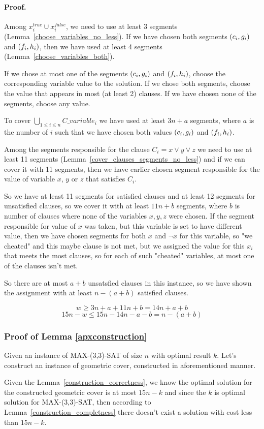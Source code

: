 \paragraph{Proof.}
Among $x_i^{true} \cup x_i^{false}$,
we need to use at least 3 segments (Lemma~\ref{choose_variables_no_less}).
If we have chosen both segments $(c_i, g_i)$ and $(f_i, h_i)$,
then we have used at least 4 segments (Lemma~\ref{choose_variables_both}).

If we chose at most one of the segments $(c_i, g_i)$ and $(f_i, h_i)$,
choose the corresponding variable value to the solution.
If we chose both segments,
choose the value that appears in most (at least 2) clauses.
If we have chosen none of the segments, choose any value.

To cover $\bigcup_{1 \le i \le n} C\_variable_i$
we have used at least $3n + a$ segments,
where $a$ is the number of $i$ such that we have chosen both
values $(c_i, g_i)$ and $(f_i, h_i)$.

Among the segments responsible for the clause $C_i = x \lor y \lor z$
we need to use at least 11 segments
(Lemma~\ref{cover_clauses_segments_no_less})
and if we can cover it with 11 segments, then we have 
earlier chosen
segment responsible for the value of variable $x$, $y$ or $z$
that satisfies $C_i$.

So we have at least 11 segments for satisfied clauses
and at least 12 segments
for unsatisfied clauses, so we cover it with 
at least $11n + b$ segments, where $b$ is number of clauses
where none of the variables $x, y, z$ were chosen.
If the segment responsible for value of $x$ was taken,
but this variable is set to have different value,
then we have chosen segments for both $x$ and $\neg x$ for this variable,
so "we cheated" and this maybe clause is not met,
but we assigned the value for this $x_i$ that meets
the most clauses, so for each of such "cheated" variables,
at most one of the clauses isn't met.

So there are at most $a+b$ unsatsfied clauses in this instance,
so we have shown the assignment with at least  $n-(a+b)$ satisfied clauses.

$$w \ge 3n + a + 11n + b = 14n + a + b$$
$$15n - w  \le 15n - 14 n - a - b = n - (a+b)$$

\subsubsection{Proof of Lemma \ref{apxconstruction}}
Given an instance of MAX-(3,3)-SAT of size $n$
with optimal result $k$.
Let's construct an instance of geometric cover,
constructed in aforementioned manner.

Given the Lemma~\ref{construction_correctness}, we know
the optimal solution for the constructed geometric cover is
at most $15n - k$ and since the $k$ is optimal solution
for MAX-(3,3)-SAT, then according to Lemma~\ref{construction_completness}
there doesn't exist a solution with cost less than $15n - k$.
